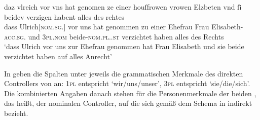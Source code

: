 \begin{exe}
\ex\label{ex:beid2p2coordncao}
	\gll daz vlreich \textelp{} vor vns hat genomen ze einer
		houſfrowen vrowen Elzbeten \textelp{} vnd ſi
		beidev \textelp{} verzigen habent \textelp{} alles des
		rehtes \\
		dass Ulrich[\textsc{nom.sg.\MascM}] {} vor uns hat genommen zu einer Ehefrau
		Frau Elisabeth-\textsc{acc.sg.\FemF} {} und \textsc{3pl\subMF{}.nom}
		beide-\textsc{nom.pl.\NeutMF.st} {} verzichtet haben {} alles des Rechts \\
		\trans `dass Ulrich \textelp{} vor uns zur Ehefrau
			genommen hat Frau Elisabeth \textelp{} und sie beide \textelp{}
			verzichtet haben auf alles Anrecht'
				\parencites(Nr.~2843, Salzburg, 1297)[175,22--25]{cao4}
\end{exe}

In  geben die Spalten unter  jeweils
die grammatischen Merkmale des direkten Controllers von  an:
\textsc{1pl} entspricht `wir/uns/unser', \textsc{3pl} entspricht `sie/die/sich'.
Die kombinierten Angaben danach stehen für die Personen\-merkmale der beiden
, das heißt, der nominalen Controller, auf die sich
 gemäß dem Schema in  indirekt
bezieht.

